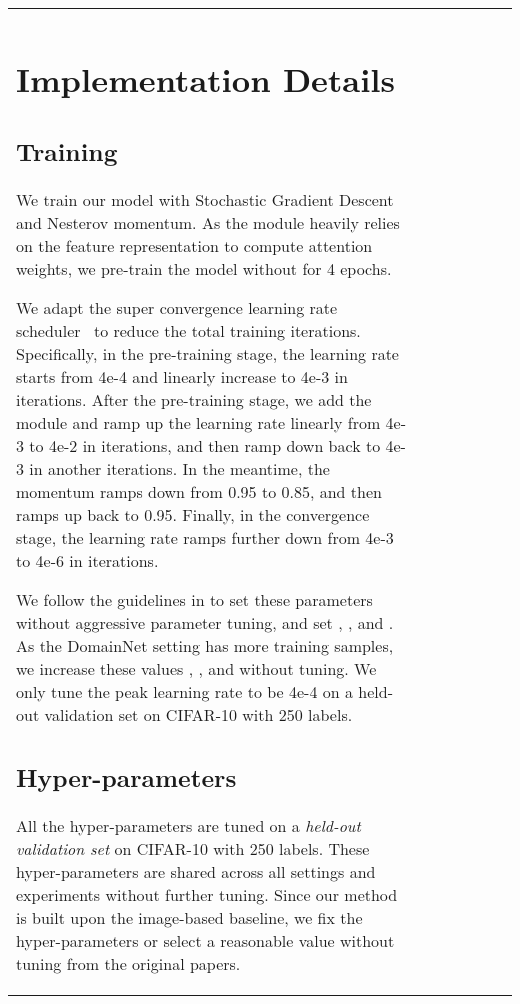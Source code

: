 \documentclass[runningheads]{llncs}
\begin{document}
\begin{table*}[t]
{\begin{tabular}{@{\extracolsep{4pt}}lcccccc@{}}
{\section{Implementation Details}
\subsection{Training}
We train our model with Stochastic Gradient Descent and Nesterov momentum.
As the  module heavily relies on the feature representation to compute attention weights, we pre-train the model without  for 4 epochs.

We adapt the super convergence learning rate scheduler~\cite{smith2019super} to reduce the total training iterations.
Specifically, in the pre-training stage, the learning rate starts from 4e-4 and linearly increase to 4e-3 in  iterations.
After the pre-training stage, we add the  module and ramp up the learning rate linearly from 4e-3 to 4e-2 in  iterations, and then ramp down back to 4e-3 in another  iterations.
In the meantime, the momentum ramps down from 0.95 to 0.85, and then ramps up back to 0.95.
Finally, in the convergence stage, the learning rate ramps further down from 4e-3 to 4e-6 in  iterations.

We follow the guidelines in \cite{smith2019super} to set these parameters without aggressive parameter tuning, and set , , and .
As the DomainNet setting has more training samples, we increase these values , , and  without tuning.
We only tune the peak learning rate to be 4e-4 on a held-out validation set on CIFAR-10 with 250 labels.


\subsection{Hyper-parameters}

All the hyper-parameters are tuned on a \emph{held-out validation set} on CIFAR-10 with 250 labels.
These hyper-parameters are shared across all settings and experiments without further tuning.
Since our method is built upon the image-based baseline, we fix the hyper-parameters or select a reasonable value without tuning from the original papers.

}
\end{tabular}}
\end{table*}
\end{document}
